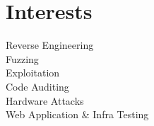\documentclass[letterpaper]{deedy-resume} %
\begin{document}
\begin{minipage}[t]{0.33\textwidth}
\sectionspace %
\sectionspace %


%
%
%
%

%
%
%
%
%


\section{Interests}
\sectionspace %
\textbullet{} Reverse Engineering \\
\textbullet{} Fuzzing \\
\textbullet{} Exploitation\\
\textbullet{} Code Auditing\\
\textbullet{} Hardware Attacks\\
\textbullet{} Web Application \& Infra Testing\\



\end{minipage}
\end{document}
